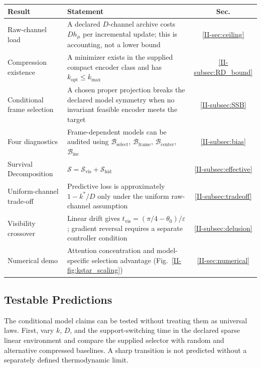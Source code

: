 \documentclass[12pt,a4paper,openany]{book}
\begin{document}
\begin{center}
\small
\setlength{\tabcolsep}{4pt}%
\begin{tabular}{@{}lP{6cm}c@{}}
\toprule
\textbf{Result} & \textbf{Statement} & \textbf{Sec.} \\
\midrule
Raw-channel load
  & A declared $D$-channel archive costs $D h_\mu$ per
    incremental update; this is accounting, not a lower bound
  & \ref{II-sec:ceiling} \\[3pt]
Compression existence
  & A minimizer exists in the supplied compact encoder class and has
    $k_{\mathrm{opt}}\leq k_{\max}$
  & \ref{II-subsec:RD_bound} \\[3pt]
Conditional frame selection
  & A chosen proper projection breaks the declared model symmetry when
    no invariant feasible encoder meets the target
  & \ref{II-subsec:SSB} \\[3pt]
Four diagnostics
  & Frame-dependent models can be audited using $\mathcal{B}_{\mathrm{select}}$,
    $\mathcal{B}_{\mathrm{frame}}$,
    $\mathcal{B}_{\mathrm{center}}$,
    $\mathcal{B}_{\mathrm{inc}}$
  & \ref{II-subsec:bias} \\[3pt]
Survival Decomposition
  & $\mathcal{S} = \mathcal{S}_{\mathrm{vis}} +
    \mathcal{S}_{\mathrm{hid}}$
  & \ref{II-subsec:effective} \\[3pt]
Uniform-channel trade-off
  & Predictive loss is approximately $1-k^*/D$ only under the
    uniform raw-channel assumption
  & \ref{II-subsec:tradeoff} \\[3pt]
Visibility crossover
  & Linear drift gives $t_{\mathrm{vis}}=(\pi/4-\theta_0)/\varepsilon$;
    gradient reversal requires a separate controller condition
  & \ref{II-subsec:delusion} \\[3pt]
Numerical demo
  & Attention concentration and model-specific selection advantage
    (Fig.~\ref{II-fig:kstar_scaling})
  & \ref{II-sec:numerical} \\
\bottomrule
\end{tabular}
\end{center}

\subsection{Testable Predictions}
\label{II-subsec:predictions}

The conditional model claims can be tested without treating them as
universal laws.  First, vary $k$, $D$, and the support-switching time in
the declared sparse linear environment and compare the supplied selector
with random and alternative compressed baselines.  A sharp transition is
not predicted without a separately defined thermodynamic limit.
\end{document}
